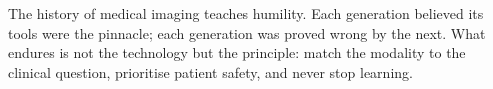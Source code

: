 \begin{pearlbox}
The history of medical imaging teaches humility. Each generation believed its tools were the pinnacle; each generation was proved wrong by the next. What endures is not the technology but the principle: match the modality to the clinical question, prioritise patient safety, and never stop learning.
\end{pearlbox}

\clearpage
